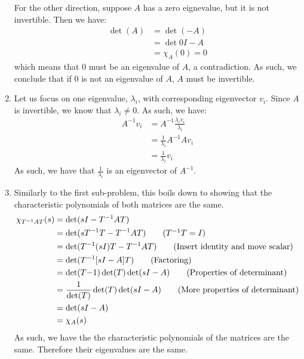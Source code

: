 \documentclass[12pt]{exam}
\begin{document}
\begin{questions}
\begin{solution}
\begin{enumerate}[label=(\alph*)]
      For the other direction, suppose $A$ has a zero eignevalue, but it is not invertible. Then we have:
      \begin{align*}
        \det (A) &= \det(-A) \\
        &= \det{0I - A} \\
        &= \chi_A(0) = 0
      \end{align*}
      which means that $0$ must be an eigenvalue of $A$, a contradiction. As such, we conclude that if $0$ is not an eigenvalue of $A$, $A$ must be invertible.
      \item Let us focus on one eigenvalue, $\lambda_i$, with corresponding eigenvector $v_i$. Since $A$ is invertible, we know that $\lambda_i \neq 0$. As such, we have:
      \begin{align*}
        A^{-1}v_i &= A^{-1}\frac{\lambda_i v_i}{\lambda_i} \tag{Multiplying by $1$, we know that $\lambda_i \neq 0$} \\
        &= \frac{1}{\lambda_i} A^{-1}Av_i \tag{Using the fact that $\lambda_i v_i = Av_i$} \\
        &= \frac{1}{\lambda_i} v_i
      \end{align*}
      As such, we have that $\frac{1}{\lambda_i}$ is an eigenvector of $A^{-1}$.
      \item Similarly to the first sub-problem, this boils down to showing that the characteristic polynomials of both matrices are the same. 
      \begin{align*}
        \chi_{T^{-1}AT}(s) &= \det(sI - T^{-1}AT) \\
        &= \det(sT^{-1}T - T^{-1}AT) \tag{$T^{-1}T = I$} \\
        &= \det(T^{-1}(sI)T - T^{-1}AT) \tag{Insert identity and move scalar} \\
        &= \det(T^{-1}[sI - A]T) \tag{Factoring} \\
        &= \det(T{-1})\det(T)\det(sI - A) \tag{Properties of determinant} \\
        &= \frac{1}{\det(T)}\det(T)\det(sI - A) \tag{More properties of determinant} \\
        &= \det(sI - A) \\
        &= \chi_A(s)
      \end{align*}
      As such, we have the the characteristic polynomials of the matrices are the same. Therefore their eigenvalues are the same.
    \end{enumerate}
  \end{solution}


\end{questions}
\end{document}
